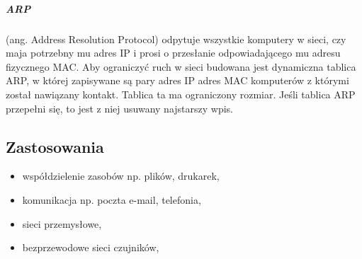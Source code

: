 \documentclass[a4paper,twoside]{report}
\begin{document}
\subparagraph{ARP} (ang. Address Resolution Protocol) odpytuje wszystkie komputery w sieci, czy maja potrzebny mu adres IP i prosi o przesłanie odpowiadającego mu adresu fizycznego MAC. Aby ograniczyć ruch w sieci budowana jest dynamiczna tablica ARP, w której zapisywane są pary adres IP adres MAC komputerów z którymi został nawiązany kontakt. Tablica ta ma ograniczony rozmiar. Jeśli tablica ARP przepełni się, to jest z niej usuwany najstarszy wpis.

\subsection{Zastosowania}
\medskip 
\begin{itemize}
\item współdzielenie zasobów np. plików, drukarek,
\item komunikacja np. poczta e-mail, telefonia,
\item sieci przemysłowe,
\item bezprzewodowe sieci czujników,
\end{itemize}
\end{document}
